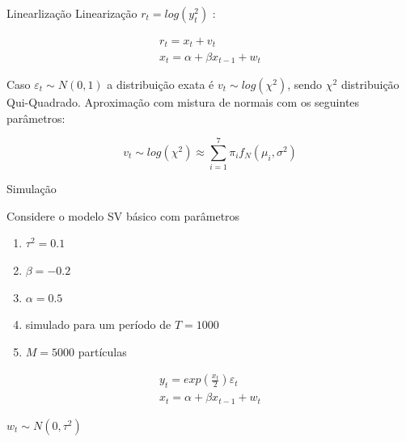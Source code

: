 \documentclass{beamer}
\begin{document}
\begin{frame}{Linearlização}
Linearização  $r_t = log(y_t^2)$  \citep{Kim1998}:


\begin{eqnarray}
r_t = x_t + v_t  \nonumber \\
x_t = \alpha + \beta x_{t-1} + w_t
\label{eq:svm_basico}
\end{eqnarray}


Caso $\varepsilon_t \sim N(0,1)$ a distribuição exata é $ v_t \sim log(\chi^2)$, sendo $\chi^2$ distribuição Qui-Quadrado. Aproximação com mistura de normais com os seguintes parâmetros:

\begin{equation}
v_t \sim log(\chi^2) \approx \sum_{i=1}^7 \pi_i f_N(\mu_i,\sigma^2)
\label{eq:mixnormal}
\end{equation}

\end{frame}


\begin{frame}{Simulação}

Considere o modelo SV básico com parâmetros 
\begin{enumerate}
\item $\tau^2=0.1$
\item $\beta=-0.2$ 
\item $\alpha=0.5$ 
\item simulado para um período de $T=1000$
\item $M=5000$ partículas
\end{enumerate}

\begin{eqnarray}
y_t = exp\left(\frac{x_t}{2}\right)\varepsilon_t \nonumber \\
x_t = \alpha +  \beta x_{t-1} + w_t
\end{eqnarray}

$w_t \sim N(0,\tau^2)$

\end{frame}
\end{document}
